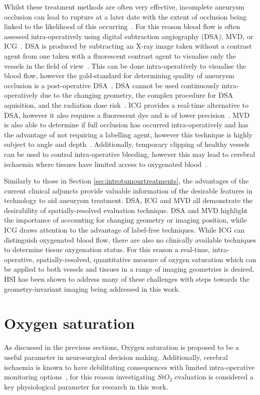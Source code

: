 Whilst these treatment methods are often very effective, incomplete aneurysm occlusion can lead to rupture at a later date with the extent of occlusion being linked to the likelihood of this occurring~\cite{Toth2018}. For this reason blood flow is often assessed intra-operatively using digital subtraction angiography (DSA), MVD, or ICG~\cite{Norat2019}. DSA is produced by subtracting an X-ray image taken without a contrast agent from one taken with a fluorescent contrast agent to visualise only the vessels in the field of view~\cite{Radiopia2022}. This can be done intra-operatively to visualise the blood flow, however the gold-standard for determining quality of aneurysm occlusion is a post-operative DSA~\cite{Marbacher2020}. DSA cannot be used continuously intra-operatively due to the changing geometry, the complex procedure for DSA aquisition, and the radiation dose risk~\cite{Radiopia2022, Derdeyn1999}. ICG provides a real-time alternative to DSA, however it also requires a fluorescent dye and is of lower precision~\cite{Norat2019, Anania2023}. MVD is also able to determine if full occlusion has occurred intra-operatively and has the advantage of not requiring a labelling agent, however this technique is highly subject to angle and depth~\cite{Anania2023}. Additionally, temporary clipping of healthy vessels can be used to control intra-operative bleeding, however this may lead to cerebral ischaemia where tissues have limited access to oxygenated blood~\cite{Doron2022}. 

Similarly to those in Section \ref{sec:introtumourtreatments}, the advantages of the current clinical adjuncts provide valuable information of the desirable features in technology to aid aneurysm treatment. DSA, ICG and MVD all demonstrate the desirability of spatially-resolved evaluation technique. DSA and MVD highlight the importance of accounting for changing geometry or imaging position, while ICG draws attention to the advantage of label-free techniques. While ICG can distinguish oxygenated blood flow, there are also no clinically available techniques to determine tissue oxygenation status. For this reason a real-time, intra-operative, spatially-resolved, quantitative measure of oxygen saturation which can be applied to both vessels and tissues in a range of imaging geometries is desired. HSI has been shown to address many of these challenges with steps towards the geometry-invariant imaging being addressed in this work. 

\section{Oxygen saturation}\label{sec:oxygensat}
As discussed in the previous sections, Oxygen saturation is proposed to be a useful parameter in neurosurgical decision making. Additionally, cerebral ischaemia is known to have debilitating consequences with limited intra-operative monitoring options~\cite{Zhou2016}, for this reason investigating $StO_2$ evaluation is considered a key physiological parameter for research in this work. 

